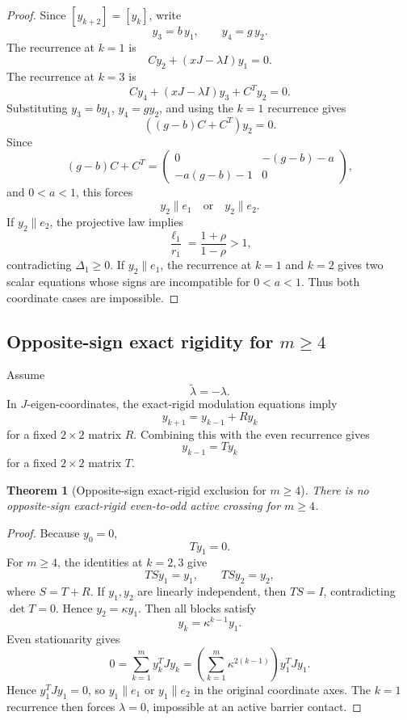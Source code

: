 \documentclass[11pt]{article}
\numberwithin{equation}{section}
\newtheorem{theorem}{Theorem}[section]
\begin{document}
\begin{proof}
Since \([y_{k+2}]=[y_k]\), write
\[
y_3=b\,y_1,\qquad y_4=g\,y_2.
\]
The recurrence at \(k=1\) is
\[
Cy_2+(xJ-\lambda I)y_1=0.
\]
The recurrence at \(k=3\) is
\[
Cy_4+(xJ-\lambda I)y_3+C^Ty_2=0.
\]
Substituting \(y_3=by_1\), \(y_4=gy_2\), and using the \(k=1\) recurrence gives
\[
((g-b)C+C^T)y_2=0.
\]
Since
\[
(g-b)C+C^T
=
\begin{pmatrix}
0&-(g-b)-a\\
-a(g-b)-1&0
\end{pmatrix},
\]
and \(0<a<1\), this forces
\[
y_2\parallel e_1
\quad\text{or}\quad
y_2\parallel e_2.
\]
If \(y_2\parallel e_2\), the projective law implies
\[
\frac{\ell_1}{r_1}=\frac{1+\rho}{1-\rho}>1,
\]
contradicting \(\Delta_1\ge0\). If \(y_2\parallel e_1\), the recurrence at \(k=1\) and
\(k=2\) gives two scalar equations whose signs are incompatible for \(0<a<1\).
Thus both coordinate cases are impossible.
\end{proof}

\subsection{\texorpdfstring{Opposite-sign exact rigidity for \(m\ge4\)}{Opposite-sign exact rigidity for m >= 4}}

Assume
\[
\widetilde\lambda=-\lambda.
\]
In \(J\)-eigen-coordinates, the exact-rigid modulation equations imply
\[
y_{k+1}=y_{k-1}+Ry_k
\]
for a fixed \(2\times2\) matrix \(R\). Combining this with the even recurrence gives
\[
y_{k-1}=Ty_k
\]
for a fixed \(2\times2\) matrix \(T\).

\begin{theorem}[Opposite-sign exact-rigid exclusion for \(m\ge4\)]
\label{thm:opposite-mge4}
There is no opposite-sign exact-rigid even-to-odd active crossing for \(m\ge4\).
\end{theorem}

\begin{proof}
Because \(y_0=0\),
\[
Ty_1=0.
\]
For \(m\ge4\), the identities at \(k=2,3\) give
\[
TSy_1=y_1,
\qquad
TSy_2=y_2,
\]
where \(S=T+R\). If \(y_1,y_2\) are linearly independent, then \(TS=I\), contradicting
\(\det T=0\). Hence \(y_2=\kappa y_1\). Then all blocks satisfy
\[
y_k=\kappa^{k-1}y_1.
\]
Even stationarity gives
\[
0=\sum_{k=1}^{m}y_k^TJy_k
=
\left(\sum_{k=1}^{m}\kappa^{2(k-1)}\right)y_1^TJy_1.
\]
Hence \(y_1^TJy_1=0\), so \(y_1\parallel e_1\) or \(y_1\parallel e_2\) in the original
coordinate axes. The \(k=1\) recurrence then forces \(\lambda=0\), impossible at an
active barrier contact.
\end{proof}
\end{document}
